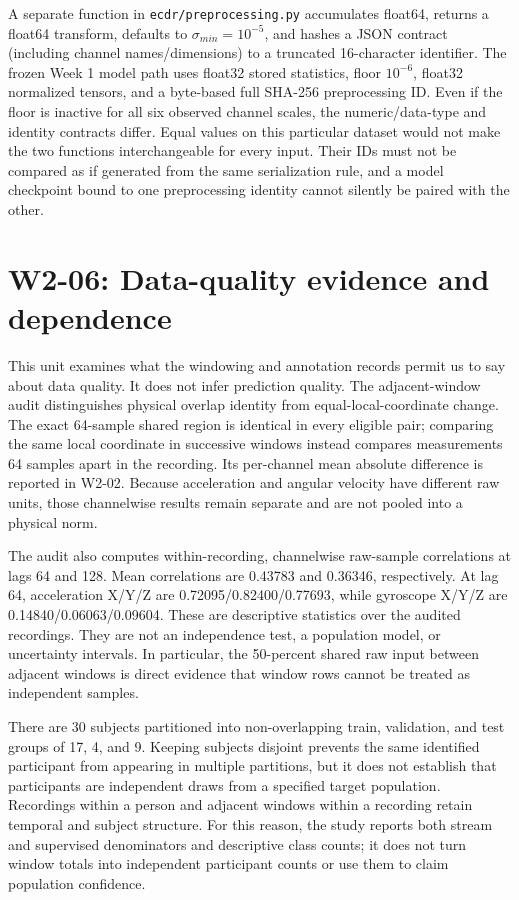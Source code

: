 \documentclass[11pt,a4paper]{article}
\newcommand{\code}[1]{{\small\ttfamily\nolinkurl{#1}}}
\begin{document}
A separate function in \code{ecdr/preprocessing.py} accumulates float64, returns a float64 transform, defaults to $\sigma_{min}=10^{-5}$, and hashes a JSON contract (including channel names/dimensions) to a truncated 16-character identifier. The frozen Week 1 model path uses float32 stored statistics, floor $10^{-6}$, float32 normalized tensors, and a byte-based full SHA-256 preprocessing ID. Even if the floor is inactive for all six observed channel scales, the numeric/data-type and identity contracts differ. Equal values on this particular dataset would not make the two functions interchangeable for every input. Their IDs must not be compared as if generated from the same serialization rule, and a model checkpoint bound to one preprocessing identity cannot silently be paired with the other.

\section{W2-06: Data-quality evidence and dependence}
This unit examines what the windowing and annotation records permit us to say about data quality. It does not infer prediction quality. The adjacent-window audit distinguishes physical overlap identity from equal-local-coordinate change. The exact 64-sample shared region is identical in every eligible pair; comparing the same local coordinate in successive windows instead compares measurements 64 samples apart in the recording. Its per-channel mean absolute difference is reported in W2-02. Because acceleration and angular velocity have different raw units, those channelwise results remain separate and are not pooled into a physical norm.

The audit also computes within-recording, channelwise raw-sample correlations at lags 64 and 128. Mean correlations are 0.43783 and 0.36346, respectively. At lag 64, acceleration X/Y/Z are 0.72095/0.82400/0.77693, while gyroscope X/Y/Z are 0.14840/0.06063/0.09604. These are descriptive statistics over the audited recordings. They are not an independence test, a population model, or uncertainty intervals. In particular, the 50-percent shared raw input between adjacent windows is direct evidence that window rows cannot be treated as independent samples.

There are 30 subjects partitioned into non-overlapping train, validation, and test groups of 17, 4, and 9. Keeping subjects disjoint prevents the same identified participant from appearing in multiple partitions, but it does not establish that participants are independent draws from a specified target population. Recordings within a person and adjacent windows within a recording retain temporal and subject structure. For this reason, the study reports both stream and supervised denominators and descriptive class counts; it does not turn window totals into independent participant counts or use them to claim population confidence.
\end{document}

